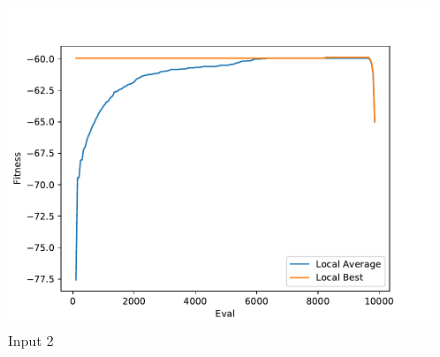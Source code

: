 \documentclass{standalone}
\begin{document}
\begin{figure}[!htb]
	\caption{Input 2}
	\label{fig:graph_2007}
	\includegraphics[width=\textwidth]{../graphs/graphs/2007.pdf}
\end{figure}
\end{document}
